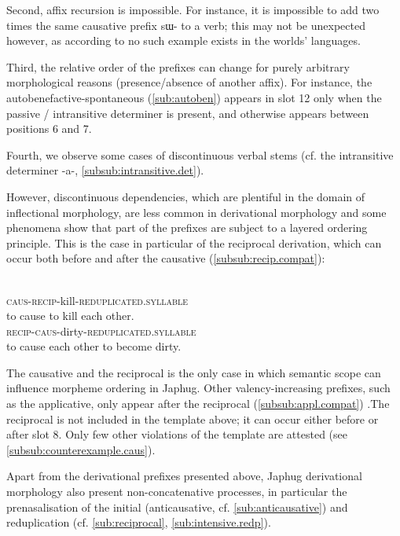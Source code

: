 \documentclass[oldfontcommands,oneside,a4paper,11pt]{memoir}
\newcommand{\ipa}[1]{{\phon #1}} %
\newcommand{\caus}{\textsc{caus}}
\newcommand{\recip}{\textsc{recip}}
\begin{document}
   
Second, affix recursion is impossible. For instance, it is impossible to add two times the same causative prefix \ipa{sɯ-} to a verb; this may not be unexpected however, as according to \citet[61]{dixon00causative} no such example exists in the worlds' languages.

Third, the relative order of the prefixes can change for purely arbitrary morphological reasons (presence/absence of another affix). For instance, the autobenefactive-spontaneous (\ref{sub:autoben}) appears in slot 12 only when the passive / intransitive determiner is present, and otherwise appears between positions 6 and 7. 

Fourth, we observe some cases of discontinuous verbal stems (cf. the intransitive determiner \ipa{-a-}, \ref{subsub:intransitive.det}). 

 
 However, discontinuous dependencies, which are plentiful in the domain of inflectional morphology, are  less common in derivational morphology and some phenomena show that part of the prefixes are subject to a layered ordering principle. This is the case in particular of the reciprocal derivation, which can occur both before and after the causative (\ref{subsub:recip.compat}):
 
    \begin{exe}
\ex
\gll   \ipa{sɯ-ɤ-sɯ-sat} \\
		\caus{}-\recip{}-kill-\textsc{reduplicated.syllable} \\
 \glt to  cause to kill each other.
\gll   \ipa{a-sɯ-ɴqʰɯ-ɴqʰi} \\
		\recip{}-\caus{}-dirty-\textsc{reduplicated.syllable} \\
 \glt to  cause each other to become dirty.
\end{exe} 
The causative and the reciprocal is the only case in which semantic scope can influence morpheme ordering in Japhug. Other valency-increasing prefixes, such as the applicative, only appear after the reciprocal (\ref{subsub:appl.compat}) .The reciprocal is not included in the template above; it can occur either before or after slot 8.
Only few other violations of the template are attested (see \ref{subsub:counterexample.caus}).


Apart from the derivational prefixes presented above, Japhug derivational morphology also present non-concatenative processes, in particular the prenasalisation of the initial (anticausative, cf. \ref{sub:anticausative}) and reduplication (cf. \ref{sub:reciprocal}, \ref{sub:intensive.redp}).
\end{document}
